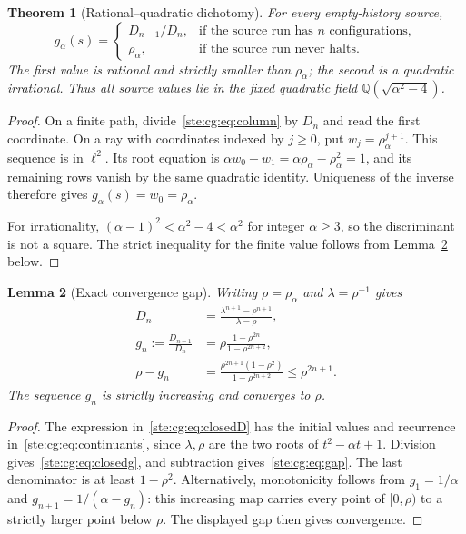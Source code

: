 \documentclass[11pt,letterpaper]{article}
\newtheorem{theorem}{Theorem}[section]
\newtheorem{lemma}[theorem]{Lemma}
\theoremstyle{definition}
\theoremstyle{remark}
\newcommand{\Q}{\mathbb Q}
\begin{document}
\begin{theorem}[Rational--quadratic dichotomy]\label{ste:cg:thm:green}
For every empty-history source,
\begin{equation}\label{ste:cg:eq:dichotomy}
 g_\alpha(s)=
 \begin{cases}
 D_{n-1}/D_n,&\text{if the source run has $n$ configurations},\\[2pt]
 \rho_\alpha,&\text{if the source run never halts}.
 \end{cases}
\end{equation}
The first value is rational and strictly smaller than $\rho_\alpha$; the
second is a quadratic irrational. Thus all source values lie in the fixed
quadratic field $\Q(\sqrt{\alpha^2-4})$.
\end{theorem}
\begin{proof}
On a finite path, divide~\eqref{ste:cg:eq:column} by $D_n$ and read the first
coordinate. On a ray with coordinates indexed by $j\ge0$, put
$w_j=\rho_\alpha^{j+1}$. This sequence is in $\ell^2$. Its root equation is
$\alpha w_0-w_1=\alpha\rho_\alpha-\rho_\alpha^2=1$, and its remaining
rows vanish by the same quadratic identity. Uniqueness of the inverse
therefore gives $g_\alpha(s)=w_0=\rho_\alpha$.

For irrationality, $(\alpha-1)^2<\alpha^2-4<\alpha^2$ for integer
$\alpha\ge3$, so the discriminant is not a square. The strict inequality
for the finite value follows from Lemma~\ref{ste:cg:lem:gap} below.
\end{proof}

\begin{lemma}[Exact convergence gap]\label{ste:cg:lem:gap}
Writing $\rho=\rho_\alpha$ and $\lambda=\rho^{-1}$ gives
\begin{align}
 D_n&=\frac{\lambda^{n+1}-\rho^{n+1}}{\lambda-\rho},\label{ste:cg:eq:closedD}\\
 g_n:=\frac{D_{n-1}}{D_n}
 &=\rho\frac{1-\rho^{2n}}{1-\rho^{2n+2}},\label{ste:cg:eq:closedg}\\
 \rho-g_n
 &=\frac{\rho^{2n+1}(1-\rho^2)}{1-\rho^{2n+2}}
 \le\rho^{2n+1}.\label{ste:cg:eq:gap}
\end{align}
The sequence $g_n$ is strictly increasing and converges to $\rho$.
\end{lemma}
\begin{proof}
The expression in~\eqref{ste:cg:eq:closedD} has the initial values and recurrence
in~\eqref{ste:cg:eq:continuants}, since $\lambda,\rho$ are the two roots of
$t^2-\alpha t+1$. Division gives~\eqref{ste:cg:eq:closedg}, and subtraction
gives~\eqref{ste:cg:eq:gap}. The last denominator is at least $1-\rho^2$.
Alternatively, monotonicity follows from $g_1=1/\alpha$ and
$g_{n+1}=1/(\alpha-g_n)$: this increasing map carries every point of
$[0,\rho)$ to a strictly larger point below $\rho$. The displayed gap
then gives convergence.
\end{proof}
\end{document}
